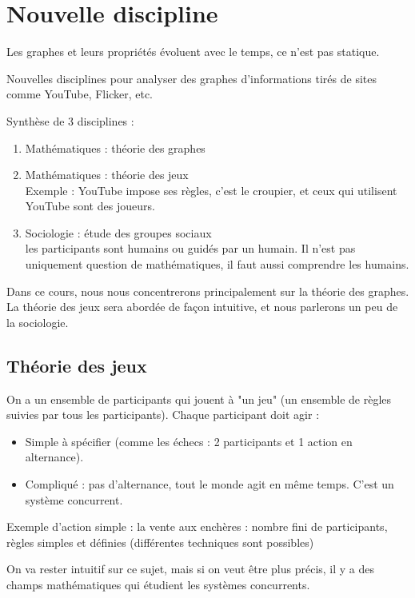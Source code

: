 \section{Nouvelle discipline}
Les graphes et leurs propriétés évoluent avec le temps, ce n'est pas statique.

Nouvelles disciplines pour analyser des graphes d'informations tirés de sites comme YouTube, Flicker, etc.

Synthèse de 3 disciplines :
\begin{enumerate}

	\item Mathématiques : théorie des graphes
	\item Mathématiques : théorie des jeux\\
		Exemple : YouTube impose ses règles, c'est le croupier, et ceux qui utilisent YouTube sont des joueurs.
	\item Sociologie : étude des groupes sociaux\\
		les participants sont humains ou guidés par un humain. Il n'est pas uniquement question de mathématiques, il faut aussi comprendre les humains.
\end{enumerate}

Dans ce cours, nous nous concentrerons principalement sur la théorie des graphes. La théorie des jeux sera abordée de façon intuitive, et nous parlerons un peu de la sociologie.

\subsection{Théorie des jeux}
On a un ensemble de participants qui jouent à "un jeu" (un ensemble de règles suivies par tous les participants). Chaque participant doit agir : 

\begin{itemize}
\item Simple à spécifier (comme les échecs : 2 participants et 1 action en alternance). 
\item Compliqué : pas d'alternance, tout le monde agit en même temps. C'est un système concurrent.
\end{itemize}

Exemple d'action simple : la vente aux enchères : 
	nombre fini de participants,
	règles simples et définies (différentes techniques sont possibles)
	
\vspace{1cm}

On va rester intuitif sur ce sujet, mais si on veut être plus précis, il y a des champs mathématiques qui étudient les systèmes concurrents.

